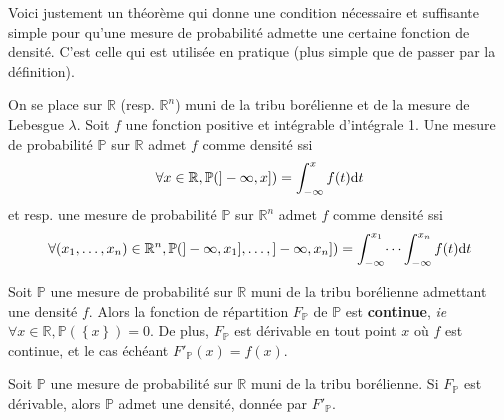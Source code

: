 \documentclass[../integ-proba.tex]{subfiles}
\begin{document}
    Voici justement un théorème qui donne une condition nécessaire et suffisante simple pour qu'une mesure de probabilité admette une certaine fonction de densité.
    C'est celle qui est utilisée en pratique (plus simple que de passer par la définition).

    \begin{thm}
        On se place sur $\mathbb{R}$ (resp. $\mathbb{R}^n$) muni de la tribu borélienne et de la mesure de Lebesgue $\lambda$.
        Soit $f$ une fonction positive et intégrable d'intégrale 1.
        Une mesure de probabilité $\mathbb{P}$ sur $\mathbb{R}$ admet $f$ comme densité ssi
        \begin{displaymath}
            \forall x \in \mathbb{R}, \mathbb{P}(]-\infty, x]) = \int_{- \infty}^x f(t)\textnormal{d}t
        \end{displaymath}
        et resp. une mesure de probabilité $\mathbb{P}$ sur $\mathbb{R}^n$ admet $f$ comme densité ssi
        \begin{displaymath}
            \forall (x_1,\ldots,x_n) \in \mathbb{R}^n, \mathbb{P}(]-\infty, x_1], \ldots, ]-\infty, x_n]) = \int_{- \infty}^{x_1} \dots \int_{- \infty}^{x_n} f(t) \textnormal{d}t
        \end{displaymath}
    \end{thm}

    \begin{prop}
        \label{prop:continuite_fdrep_densite}
        Soit $\mathbb{P}$ une mesure de probabilité sur $\mathbb{R}$ muni de la tribu borélienne admettant une densité $f$.
        Alors la fonction de répartition $F_\mathbb{P}$ de $\mathbb{P}$ est \textbf{continue}, \textit{ie} $\forall x \in \mathbb{R}, \mathbb{P}(\left\{ x \right\}) = 0$.
        De plus, $F_\mathbb{P}$ est dérivable en tout point $x$ où $f$ est continue, et le cas échéant $F'_\mathbb{P}(x) = f(x)$.
    \end{prop}

    \begin{prop}
        Soit $\mathbb{P}$ une mesure de probabilité sur $\mathbb{R}$ muni de la tribu borélienne.
        Si $F_\mathbb{P}$ est dérivable, alors $\mathbb{P}$ admet une densité, donnée par $F'_\mathbb{P}$.
    \end{prop}

\end{document}
